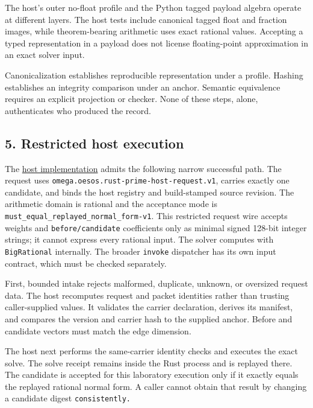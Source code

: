 \documentclass[
  11pt,
]{article}
\newcommand{\passthrough}[1]{#1}
\begin{document}
The host's outer no-float profile and the Python tagged payload algebra
operate at different layers. The host tests include canonical tagged
float and fraction images, while theorem-bearing arithmetic uses exact
rational values. Accepting a typed representation in a payload does not
license floating-point approximation in an exact solver input.

Canonicalization establishes reproducible representation under a
profile. Hashing establishes an integrity comparison under an anchor.
Semantic equivalence requires an explicit projection or checker. None of
these steps, alone, authenticates who produced the record.

\subsection{5. Restricted host
execution}\label{restricted-host-execution}

The
\href{https://github.com/dbccpage/the_symbol_game/blob/52cb5457f6c485ba548cfd292f6012a941ed22cf/omega_engine/crates_rs/omega_symbol_game/src/host.rs}{host
implementation} admits the following narrow successful path. The request
uses \nolinkurl{omega.oesos.rust-prime-host-request.v1}, carries exactly
one candidate, and binds the host registry and build-stamped source
revision. The arithmetic domain is rational and the acceptance mode is
\nolinkurl{must_equal_replayed_normal_form-v1}. This restricted request
wire accepts weights and \nolinkurl{before/candidate} coefficients only
as minimal signed 128-bit integer strings; it cannot express every
rational input. The solver computes with
\passthrough{\lstinline!BigRational!} internally. The broader
\passthrough{\lstinline!invoke!} dispatcher has its own input contract,
which must be checked separately.

First, bounded intake rejects malformed, duplicate, unknown, or
oversized request data. The host recomputes request and packet
identities rather than trusting caller-supplied values. It validates the
carrier declaration, derives its manifest, and compares the version and
carrier hash to the supplied anchor. Before and candidate vectors must
match the edge dimension.

The host next performs the same-carrier identity checks and executes the
exact solve. The solve receipt remains inside the Rust process and is
replayed there. The candidate is accepted for this laboratory execution
only if it exactly equals the replayed rational normal form. A caller
cannot obtain that result by changing a candidate digest
\nolinkurl{consistently.}
\end{document}
